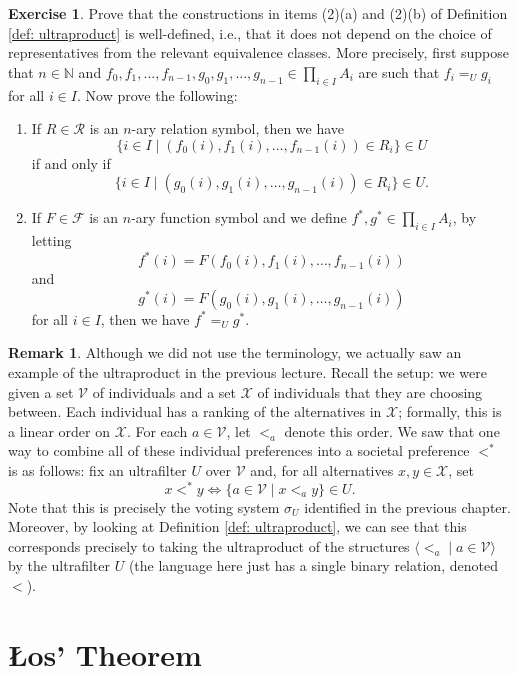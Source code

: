 \documentclass[a4paper]{memoir}
\theoremstyle{definition}
\newtheorem{remark}[theorem]{Remark}
\newtheorem{exercise}[theorem]{Exercise}
\newcommand{\bb}{\mathbb}
\newcommand{\mc}{\mathcal}
\begin{document}
\begin{exercise}
  Prove that the constructions in items (2)(a) and (2)(b) of Definition \ref{def: ultraproduct} is 
  well-defined, i.e., that it does not depend on the choice of representatives from the relevant 
  equivalence classes. More precisely, first suppose that $n \in \bb{N}$ and 
  $f_0, f_1, \ldots, f_{n-1}, g_0, g_1, \ldots, g_{n-1} \in \prod_{i \in I} A_i$ are such that 
  $f_i =_U g_i$ for all $i \in I$. Now prove the following:
  \begin{enumerate}
    \item If $R \in \mc{R}$ is an $n$-ary relation symbol, then we have 
    \[
      \{ i \in I \mid (f_0(i), f_1(i), \ldots, f_{n-1}(i)) \in R_i\} \in U
    \]
    if and only if
    \[
      \{i \in I \mid (g_0(i), g_1(i), \ldots, g_{n-1}(i)) \in R_i\} \in U.
    \]
    \item If $F \in \mc{F}$ is an $n$-ary function symbol and we define $f^*, g^* \in \prod_{i \in I} 
    A_i$, by letting 
    \[
      f^*(i) = F(f_0(i), f_1(i), \ldots, f_{n-1}(i))
    \]
    and 
    \[
      g^*(i) = F(g_0(i), g_1(i), \ldots, g_{n-1}(i))
    \]
    for all $i \in I$, then we have $f^* =_U g^*$.
  \end{enumerate}
\end{exercise}

\begin{remark}
Although we did not use the terminology, we actually saw an example of the ultraproduct in 
the previous lecture. Recall the setup: we were given a set $\mc{V}$ of individuals and a set 
$\mc{X}$ of individuals that they are choosing between. Each individual has a ranking of 
the alternatives in $\mc{X}$; formally, this is a linear order on $\mc{X}$. For each 
$a \in \mc{V}$, let $<_a$ denote this order. We saw that one way to combine all of these 
individual preferences into a societal preference $<^*$ is as follows: fix an ultrafilter 
$U$ over $\mc{V}$ and, for all alternatives $x,y \in \mc{X}$, set 
\[
  x <^* y \Longleftrightarrow \{a \in \mc{V} \mid x <_a y\} \in U.
\]
Note that this is precisely the voting system $\sigma_U$ identified in the previous chapter. 
Moreover, by looking at Definition \ref{def: ultraproduct}, we can see that this corresponds 
precisely to taking the ultraproduct of the structures $\langle <_a \mid a \in \mc{V} \rangle$ 
by the ultrafilter $U$ (the language here just has a single binary relation, denoted $<$).
\end{remark}

\section{\L os' Theorem}
\end{document}
